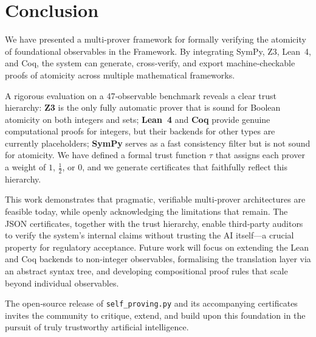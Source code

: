 \newpage
\section{Conclusion}

We have presented a multi‑prover framework for formally verifying the
atomicity of foundational observables in the \Apeiron{} Framework.  By
integrating SymPy, Z3, Lean~4, and Coq, the system can generate,
cross‑verify, and export machine‑checkable proofs of atomicity across
multiple mathematical frameworks.

A rigorous evaluation on a 47‑observable benchmark reveals a clear trust
hierarchy: \textbf{Z3} is the only fully automatic prover that is sound for
Boolean atomicity on both integers and sets; \textbf{Lean~4} and \textbf{Coq}
provide genuine computational proofs for integers, but their backends for
other types are currently placeholders; \textbf{SymPy} serves as a fast
consistency filter but is not sound for atomicity.  We have defined a formal
trust function $\tau$ that assigns each prover a weight of $1$, $\frac{1}{2}$,
or $0$, and we generate certificates that faithfully reflect this hierarchy.

This work demonstrates that pragmatic, verifiable multi‑prover architectures
are feasible today, while openly acknowledging the limitations that remain.
The JSON certificates, together with the trust hierarchy, enable third‑party
auditors to verify the system’s internal claims without trusting the AI
itself—a crucial property for regulatory acceptance.  Future work will focus
on extending the Lean and Coq backends to non‑integer observables,
formalising the translation layer via an abstract syntax tree, and developing
compositional proof rules that scale beyond individual observables.

The open‑source release of \texttt{self\_proving.py} and its accompanying
certificates invites the community to critique, extend, and build upon this
foundation in the pursuit of truly trustworthy artificial intelligence.